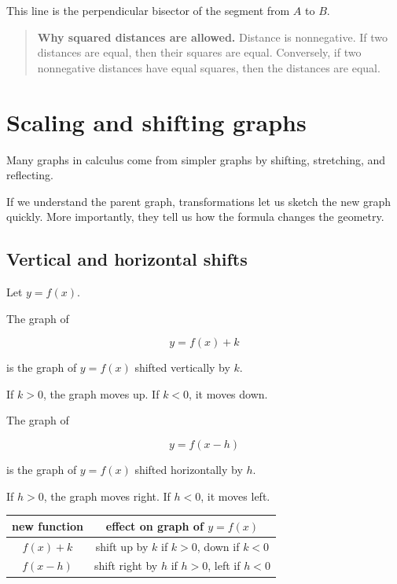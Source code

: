 This line is the perpendicular bisector of the segment from \(A\) to \(B\).

\begin{quote}
\textbf{Why squared distances are allowed.}
Distance is nonnegative.  If two distances are equal, then their squares are equal.
Conversely, if two nonnegative distances have equal squares, then the distances are
equal.
\end{quote}

\section{Scaling and shifting graphs}
\label{appsec:scaling-shifting-graphs}

Many graphs in calculus come from simpler graphs by shifting, stretching, and
reflecting.

If we understand the parent graph, transformations let us sketch the new graph
quickly.  More importantly, they tell us how the formula changes the geometry.

\subsection{Vertical and horizontal shifts}
\label{appsubsec:vertical-horizontal-shifts}

Let \(y=f(x)\).

The graph of

\[
y=f(x)+k
\]

is the graph of \(y=f(x)\) shifted vertically by \(k\).

If \(k>0\), the graph moves up.  If \(k<0\), it moves down.

The graph of

\[
y=f(x-h)
\]

is the graph of \(y=f(x)\) shifted horizontally by \(h\).

If \(h>0\), the graph moves right.  If \(h<0\), it moves left.

\begin{center}
\renewcommand{\arraystretch}{1.6}
\begin{tabular}{c|c}
\textbf{new function} & \textbf{effect on graph of \(y=f(x)\)} \\ \hline
\(f(x)+k\) & shift up by \(k\) if \(k>0\), down if \(k<0\) \\
\(f(x-h)\) & shift right by \(h\) if \(h>0\), left if \(h<0\)
\end{tabular}
\end{center}

